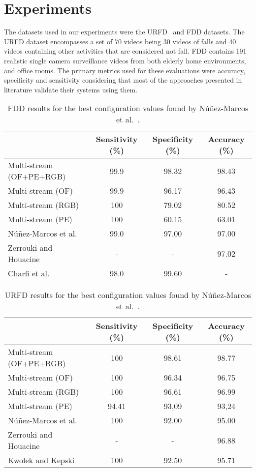 \documentclass{article}
\begin{document}
\section{Experiments}
\label{sec:experiments}

 The datasets used in our experiments were the URFD~\cite{kwolek2014human} and FDD datasets. The URFD dataset encompasses a set of 70 videos being 30 videos of falls and 40 videos containing other activities that are considered not fall. FDD contains 191 realistic single camera surveillance videos from both elderly home environments, and office rooms. The primary metrics used for these evaluations were accuracy, specificity and sensitivity considering that most of the approaches presented in literature validate their systems using them.

\begin{table*}[!htb]
\renewcommand{\tabcolsep}{6.0mm}
\centering
\caption{FDD results for the best configuration values found by N\'u\~nez-Marcos et al.~\cite{nunez2017vision}.}
\label{tab:FDD}
\begin{tabular}{lccc}
\toprule
 & Sensitivity (\%) & Specificity (\%) & Accuracy (\%) \\
\midrule
Multi-stream (OF+PE+RGB) & 99.9  & 98.32 & 98.43 \\
Multi-stream (OF) & 99.9 & 96.17 & 96.43 \\
Multi-stream (RGB)& 100	 & 79.02 & 80.52\\
Multi-stream (PE) &	100	 & 60.15 & 63.01\\
\midrule
N\'u\~nez-Marcos et al.~\cite{nunez2017vision} & 99.0 & 97.00 & 97.00 \\
Zerrouki and Houacine~\cite{zerrouki2018combined} & - & - & 97.02 \\
Charfi et al.~\cite{charfi2012definition} & 98.0 & 99.60 & - \\
\midrule
\end{tabular}
\end{table*}

\begin{table*}[!htb]
\renewcommand{\tabcolsep}{6.0mm}
\centering
\caption{URFD results for the best configuration values found by N\'u\~nez-Marcos et al.~\cite{nunez2017vision}.}
\label{tab:URFD}
\begin{tabular}{lccc}
\toprule
 & Sensitivity (\%) & Specificity (\%) & Accuracy (\%) \\
 \midrule
Multi-stream (OF+PE+RGB) & 100 & 98.61 & 98.77 \\
Multi-stream (OF) & 100 & 96.34 & 96.75 \\
Multi-stream (RGB)& 100	& 96.61	& 96.99\\
Multi-stream (PE) &	94.41 &	93,09 &	93,24\\
\midrule
N\'u\~nez-Marcos et al.~\cite{nunez2017vision} & 100 & 92.00 & 95.00 \\
Zerrouki and Houacine~\cite{zerrouki2018combined} & - & - & 96.88 \\
Kwolek and Kepski~\cite{kwolek2015improving} & 100 & 92.50 & 95.71 \\
\midrule
\end{tabular}
\end{table*}
\end{document}

